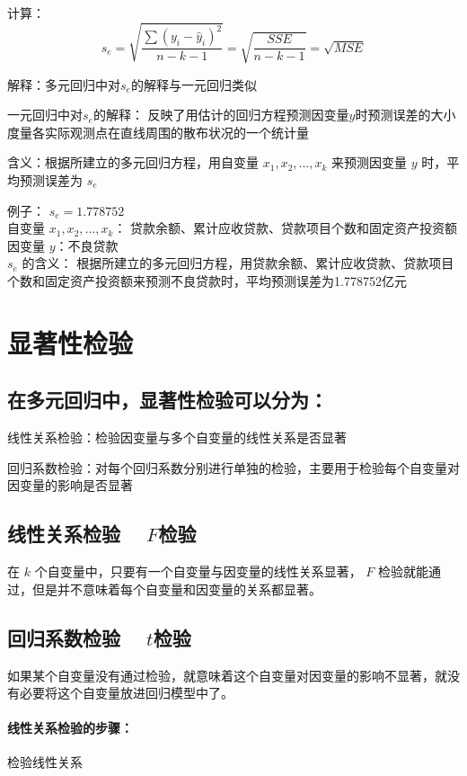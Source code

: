 \documentclass[UTF8,10pt]{book}
\begin{document}
{计算： 
$$ s_{e}=\sqrt{\frac{\sum\left(y_{i}-\hat{y}_{i}\right)^{2}}{n-k-1}}=\sqrt{\frac{S S E}{n-k-1}}=\sqrt{M S E} $$ 

解释：多元回归中对$s_e$的解释与一元回归类似 

一元回归中对$s_e$的解释： 反映了用估计的回归方程预测因变量$y$时预测误差的大小度量各实际观测点在直线周围的散布状况的一个统计量 

含义：根据所建立的多元回归方程，用自变量 $x_1,x_2,...,x_k$ 来预测因变量 $y$ 时，平均预测误差为 $s_e$ 

例子： $s_e = 1.778752$ \\
自变量 $x_1,x_2,...,x_k$：
贷款余额、累计应收贷款、贷款项目个数和固定资产投资额 \\
因变量 $y$：不良贷款\\
 $s_e$ 的含义： 根据所建立的多元回归方程，用贷款余额、累计应收贷款、贷款项目个数和固定资产投资额来预测不良贷款时，平均预测误差为1.778752亿元

\section{显著性检验}
\subsection{在多元回归中，显著性检验可以分为：}	

线性关系检验：检验因变量与多个自变量的线性关系是否显著

回归系数检验：对每个回归系数分别进行单独的检验，主要用于检验每个自变量对因变量的影响是否显著

\subsection{线性关系检验 $\quad F$检验}	在 $k$ 个自变量中，只要有一个自变量与因变量的线性关系显著， $F$ 检验就能通过，但是并不意味着每个自变量和因变量的关系都显著。

\subsection{回归系数检验 $\quad t$检验}	如果某个自变量没有通过检验，就意味着这个自变量对因变量的影响不显著，就没有必要将这个自变量放进回归模型中了。

\paragraph{线性关系检验的步骤：}	检验线性关系

}
\end{document}
